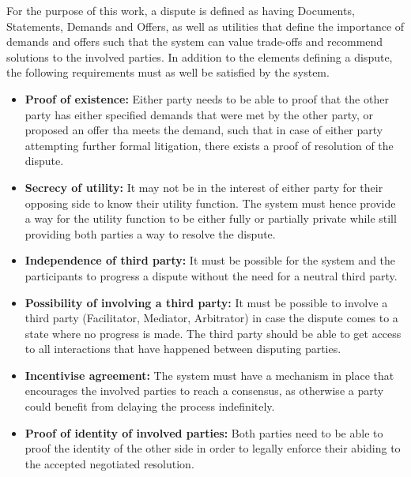\documentclass[12pt,msc,a4paper,oneside]{ucl_thesis}
\begin{document}
For the purpose of this work, a dispute is defined as having Documents, Statements, Demands and Offers, as well as utilities that define the importance of demands and offers such that the system can value trade-offs and recommend solutions to the involved parties. In addition to the elements defining a dispute, the following requirements must as well be satisfied by the system.
\begin{itemize}

    \item{\textbf{Proof of existence:}} Either party needs to be able to proof that the other party has either specified demands that were met by the other party, or proposed an offer tha meets the demand, such that in case of either party attempting further formal litigation, there exists a proof of resolution of the dispute.

    \item{\textbf{Secrecy of utility:}} It may not be in the interest of either party for their opposing side to know their utility function. The system must hence provide a way for the utility function to be either fully or partially private while still providing both parties a way to resolve the dispute.

    \item{\textbf{Independence of third party:}} It must be possible for the system and the participants to progress a dispute without the need for a neutral third party.

    \item{\textbf{Possibility of involving a third party:}} It must be possible to involve a third party (Facilitator, Mediator, Arbitrator) in case the dispute comes to a state where no progress is made. The third party should be able to get access to all interactions that have happened between disputing parties.

    \item{\textbf{Incentivise agreement:}} The system must have a mechanism in place that encourages the involved parties to reach a consensus, as otherwise a party could benefit from delaying the process indefinitely.

    \item{\textbf{Proof of identity of involved parties:}} Both parties need to be able to proof the identity of the other side in order to legally enforce their abiding to the accepted negotiated resolution.

\end{itemize}
\end{document}
